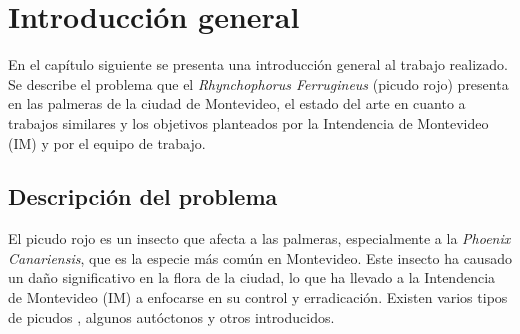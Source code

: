 
\chapter{Introducción general} %

\label{Chapter1} %
\label{IntroGeneral}

En el capítulo siguiente se presenta una introducción general al trabajo realizado. Se describe el problema que el \textit{Rhynchophorus Ferrugineus} (picudo rojo) presenta en las palmeras de la ciudad de Montevideo, el estado del arte en cuanto a trabajos similares y los objetivos planteados por la Intendencia de Montevideo (IM) y por el equipo de trabajo.


\newcommand{\keyword}[1]{\textbf{#1}}
\newcommand{\tabhead}[1]{\textbf{#1}}
\newcommand{\code}[1]{\texttt{#1}}
\newcommand{\file}[1]{\texttt{\bfseries#1}}
\newcommand{\option}[1]{\texttt{\itshape#1}}
\newcommand{\grados}{$^{\circ}$}
\newcommand{\comment}[1]{}

\section{Descripción del problema}
\label{sec:descProblema}

El picudo rojo \comment{TODO: que puede observarse en la figura 1.1,} \comment{TODO: Poner referencia al picudo rojo} es un insecto que afecta a las palmeras, especialmente a la \textit{Phoenix Canariensis}, que es la especie más común en Montevideo. Este insecto ha causado un daño significativo en la flora de la ciudad, lo que ha llevado a la Intendencia de Montevideo (IM) a enfocarse en su control y erradicación. Existen varios tipos de picudos \comment{TODO: Poner referencia a los tipos de picudos}, algunos autóctonos y otros introducidos.

